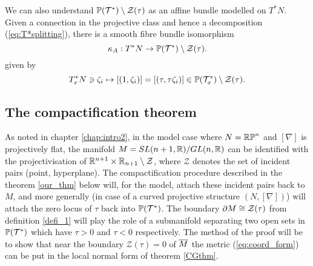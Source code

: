 \begin{rmk} We can also understand $\mathbb{P}(\mathcal{T}^*)\setminus \mathcal{Z}(\tau)$ as an affine bundle modelled on $T^* N$. Given a connection in the projective class and hence a decomposition (\ref{eq:T*splitting}), there is a smooth fibre bundle isomorphism
  \begin{equation}\label{key-id}
\kappa_A : T^* N\to \mathbb{P}(\mathcal{T}^*)\setminus \mathcal{Z}(\tau).
    \end{equation}
%
given by
\begin{equation} \label{eq:T*N_is_M}
T_x^*N\ni \zeta_i  \mapsto [(1,\zeta_i)]=[(\tau,\tau \zeta_i)]\in
\mathbb{P}(\mathcal{T}_x^*)\setminus \mathcal{Z}(\tau) .
\end{equation}
\end{rmk}


\subsection{The compactification theorem}

As noted in chapter \ref{chap:intro2}, in the model case where $N=\mathbb{RP}^n$ and $[\nabla]$ is projectively flat, the manifold $M=SL(n+1, \mathbb{R})/GL(n, \mathbb{R})$ can be identified with the projectivisation of $\mathbb{R}^{n+1}\times \mathbb{R}_{n+1}\setminus {\mathcal Z}$, where ${\mathcal Z}$ denotes the set of incident pairs (point, hyperplane). The compactification procedure described in the theorem \ref{our_thm} below will, for the model, attach these incident pairs back to $M$, and more generally (in case of a curved projective structure $(N,[\nabla])$) will attach the zero locus of $\tau$ back into $\mathbb{P}(\mathcal{T}^*)$. The boundary $\partial M \cong \mathcal{Z}(\tau)$ from definition \ref{defi_1} will play the role of a submanifold
separating two open sets in $\mathbb{P}(\mathcal{T}^*)$ which have $\tau>0$ and $\tau<0$ respectively. The method of the proof will be to show that near
the boundary ${\mathcal{Z}}(\tau)=0$ of $\overline{M}$ the metric 
(\ref{eq:coord_form}) can be put in the local normal form of theorem 
\ref{CGthm}.

